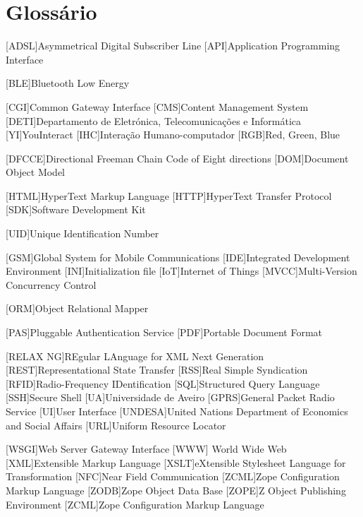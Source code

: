 \chapter*{Glossário}
	\begin{acronym}[RELAX NG]
		
		{Asymmetrical Digital Subscriber Line}
		[API]{Application Programming Interface}
		
		[BLE]{Bluetooth Low Energy}
		
		[CGI]{Common Gateway Interface}
		[CMS]{Content Management System}
		{Departamento de Eletrónica, Telecomunicações e Informática  }
		[YI]{YouInteract}		
		[IHC]{Interação Humano-computador}	
        [RGB]{Red, Green, Blue}
        
		[DFCCE]{Directional Freeman Chain Code of Eight directions}
		[DOM]{Document Object Model}
		
		{HyperText Markup Language}
		{HyperText Transfer Protocol}		
		[SDK]{Software Development Kit}
        
        [UID]{Unique Identification Number}
        
        [GSM]{Global System for Mobile Communications}
		[IDE]{Integrated Development Environment}
		[INI]{Initialization file}	
		[IoT]{Internet of Things}			
		{Multi-Version Concurrency Control}		

		[ORM]{Object Relational Mapper}
		
		[PAS]{Pluggable Authentication Service}
		[PDF]{Portable Document Format}
		
		[RELAX NG]{REgular LAnguage for XML Next Generation}
		{Representational State Transfer}
		[RSS]{Real Simple Syndication}
		{Radio-Frequency IDentification}
		[SQL]{Structured Query Language}		
		[SSH]{Secure Shell}
		[UA]{Universidade de Aveiro}
        [GPRS]{General Packet Radio Service}
		[UI]{User Interface}
		[UNDESA]{United Nations Department of Economics and Social Affairs}
		[URL]{Uniform Resource Locator}
		
		{Web Server Gateway Interface}
		[WWW]{ World Wide Web}
		[XML]{Extensible Markup Language}
		{eXtensible Stylesheet Language for Transformation}
		[NFC]{Near Field Communication}
		{Zope Configuration Markup Language}
		{Zope Object Data Base}
		{Z Object Publishing Environment}
		{Zope Configuration Markup Language}
	\end{acronym}